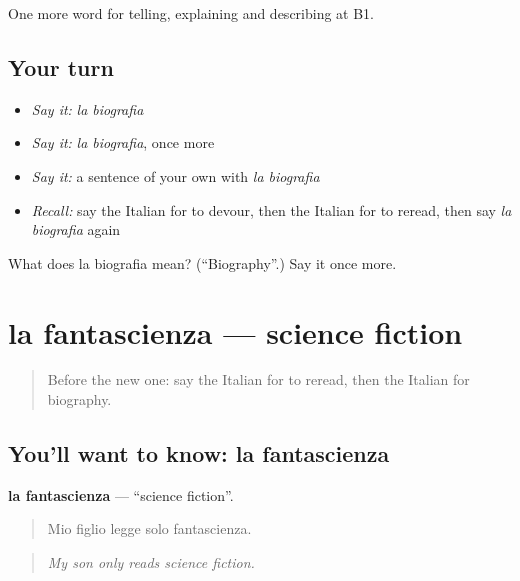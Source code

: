 \begin{grammarlens}[title={What you've built}]
One more word for telling, explaining and describing at B1.
\end{grammarlens}

\subsection*{Your turn}
\begin{itemize}
\raggedright
  \item \emph{Say it:} \emph{la biografia}
  \item \emph{Say it:} \emph{la biografia}, once more
  \item \emph{Say it:} a sentence of your own with \emph{la biografia}
  \item \emph{Recall:} say the Italian for to devour, then the Italian for to reread, then say \emph{la biografia} again
\end{itemize}

\begin{tcolorbox}[breakable,colback=teal!4,colframe=teal!35!black,title={Before you move on}]
What does la biografia mean? (\textquotedblleft{}Biography\textquotedblright{}.) Say it once more.
\end{tcolorbox}
\section[la fantascienza]{la fantascienza — science fiction}

\label{lesson:IT-C527-fantascienza}



\begin{quote}
Before the new one: say the Italian for to reread, then the Italian for biography.
\end{quote}

\subsection*{You'll want to know: la fantascienza}
\textbf{la fantascienza} — \textquotedblleft{}science fiction\textquotedblright{}.

\begin{quote}
Mio figlio legge solo fantascienza.
\end{quote}

\begin{quote}
\emph{My son only reads science fiction.}
\end{quote}

